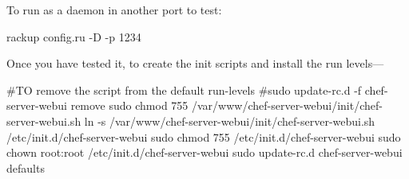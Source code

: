 To run as a daemon in another port to test:
\begin{codelisting}
\label{code:}
\codecaption{}
\begin{code}
rackup config.ru -D -p 1234
\end{code}
\end{codelisting}

Once you have tested it, to create the init scripts and install the run levels---
\begin{codelisting}
\label{code:}
\codecaption{}
\begin{code}
#TO remove the script from the default run-levels
#sudo update-rc.d -f chef-server-webui remove
sudo chmod 755 /var/www/chef-server-webui/init/chef-server-webui.sh
ln -s /var/www/chef-server-webui/init/chef-server-webui.sh /etc/init.d/chef-server-webui
sudo chmod 755 /etc/init.d/chef-server-webui
sudo chown root:root /etc/init.d/chef-server-webui
sudo update-rc.d chef-server-webui defaults
\end{code}
\end{codelisting}